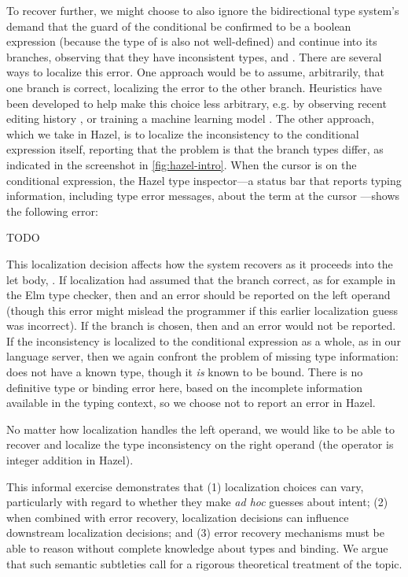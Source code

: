 To recover further, we might choose to also ignore the bidirectional type system's demand that the guard of the conditional be confirmed to be a boolean expression 
(because the type of  is also not well-defined) 
and continue into its branches, observing that they have inconsistent types,  and . 
There are several ways to localize this error. 
One approach would be to assume, arbitrarily, that one branch is correct, localizing the error to the other branch. 
Heuristics have been developed to help make this choice less arbitrary, e.g. 
by observing recent editing history , 
or training a machine learning model . 
The other approach, which we take in Hazel, is to localize the inconsistency to the conditional expression itself, reporting that the problem is that the branch types differ, as indicated in
the screenshot in \autoref{fig:hazel-intro}. When the cursor is on the conditional expression, the Hazel type inspector---a status bar that reports typing information, including type error messages, about the term at the cursor \cite{hannah1}---shows the following error:

TODO

This localization decision affects how the system recovers as it proceeds into the let body, . 
If localization had assumed that the  branch correct, as for example in the Elm type checker, then  and an error should be reported on the left operand (though this error might mislead the programmer if this earlier localization guess was incorrect).
If the  branch is chosen, then  and an error would not be reported. 
If the inconsistency is localized to the conditional expression as a whole, as in our language server, then we again confront the problem of missing type information: 
 does not have a known type,
though it \emph{is} known to be bound. 
There is no definitive type or binding error here, based on the incomplete information available in the typing context, 
so we choose not to report an error in Hazel.

No matter how localization handles the left operand, we would like to be able to recover and 
localize the type inconsistency on the right operand (the \li{+} operator is integer addition in Hazel).

This informal exercise demonstrates that (1) localization choices can vary, particularly with regard to whether they make \emph{ad hoc} guesses about intent;  
(2) when combined with error recovery, localization decisions can influence downstream localization decisions; and 
(3) error recovery mechanisms must be able to reason without complete knowledge about types and binding. We argue that such semantic subtleties call for a rigorous theoretical treatment of the topic.

